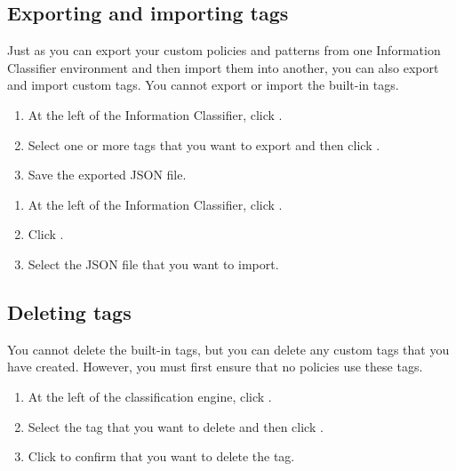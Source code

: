 \documentclass[letterpaper,10pt,english]{sphinxmanual}
\begin{document}
\subsection{Exporting and importing tags}
\label{\detokenize{mcdmp_app_ug:exporting-and-importing-tags}}
Just as you can export your custom policies and patterns from one Information Classifier environment and then import them into another, you can also export and import custom tags. You cannot export or import the built-in tags.

\begin{enumerate}
\item {} 
At the left of the Information Classifier, click .

\item {} 
Select one or more tags that you want to export and then click .

\item {} 
Save the exported JSON file.

\end{enumerate}

\begin{enumerate}
\item {} 
At the left of the Information Classifier, click .

\item {} 
Click .

\item {} 
Select the JSON file that you want to import.

\end{enumerate}


\subsection{Deleting tags}
\label{\detokenize{mcdmp_app_ug:deleting-tags}}
You cannot delete the built-in tags, but you can delete any custom tags that you have created. However, you must first ensure that no policies use these tags.

\begin{enumerate}
\item {} 
At the left of the classification engine, click .

\item {} 
Select the tag that you want to delete and then click .

\item {} 
Click  to confirm that you want to delete the tag.

\end{enumerate}
\end{document}
